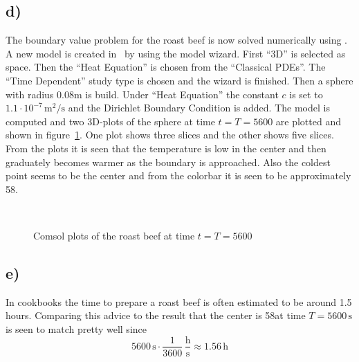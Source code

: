    \subsection*{d)}

    The boundary value problem for the roast beef is now solved numerically using \comsol. A new model is created in \comsol\ by using the model wizard. First ``3D'' is selected as space. Then the ``Heat Equation'' is chosen from the ``Classical PDEs''. The ``Time Dependent'' study type is chosen and the wizard is finished. Then a sphere with radius $0.08$m is build. Under ``Heat Equation'' the constant $c$ is set to $1.1\cdot10^{-7}\,\text{m}^2/\text{s}$ and the Dirichlet Boundary Condition is added. The model is computed and two 3D-plots of the sphere at time $t=T=5600$ are plotted and shown in figure~\ref{fig:comsol}. One plot shows three slices and the other shows five slices. From the plots it is seen that the temperature is low in the center and then graduately becomes warmer as the boundary is approached. Also the coldest point seems to be the center and from the colorbar it is seen to be approximately 58\celsius.

    \begin{figure}
    \centering
    \mbox{ \quad 
        }
    \caption{Comsol plots of the roast beef at time $t=T=5600$}
    \label{fig:comsol}
    \end{figure}

    \subsection*{e)}

    In cookbooks the time to prepare a roast beef is often estimated to be around 1.5 hours. Comparing this advice to the result that the center is 58\celsius at time $T=5600\,\text{s}$ is seen to match pretty well since
    \begin{equation*}
        5600\,\text{s} \cdot \frac{1}{3600}\,\frac{\text{h}}{\text{s}} \approx 1.56\,\text{h}
    \end{equation*}


